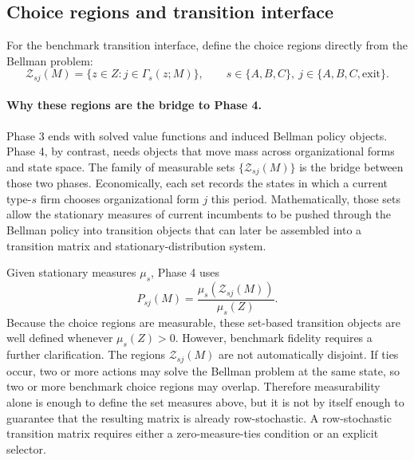 \subsection{Choice regions and transition interface}

For the benchmark transition interface, define the choice regions directly from the Bellman problem:
\[
\mathcal Z_{sj}(M)=\{z\in Z:j\in\Gamma_s(z;M)\},
\qquad s\in\{A,B,C\},\ j\in\{A,B,C,\mathrm{exit}\}.
\]
\paragraph{Why these regions are the bridge to Phase 4.}
Phase 3 ends with solved value functions and induced Bellman policy objects. Phase 4, by contrast, needs objects that move mass across organizational forms and state space. The family of measurable sets $\{\mathcal Z_{sj}(M)\}$ is the bridge between those two phases. Economically, each set records the states in which a current type-$s$ firm chooses organizational form $j$ this period. Mathematically, those sets allow the stationary measures of current incumbents to be pushed through the Bellman policy into transition objects that can later be assembled into a transition matrix and stationary-distribution system.

Given stationary measures $\mu_s$, Phase 4 uses
\[
P_{sj}(M)=\frac{\mu_s(\mathcal Z_{sj}(M))}{\mu_s(Z)}.
\]
Because the choice regions are measurable, these set-based transition objects are well defined whenever $\mu_s(Z)>0$. However, benchmark fidelity requires a further clarification. The regions $\mathcal Z_{sj}(M)$ are not automatically disjoint. If ties occur, two or more actions may solve the Bellman problem at the same state, so two or more benchmark choice regions may overlap. Therefore measurability alone is enough to define the set measures above, but it is not by itself enough to guarantee that the resulting matrix is already row-stochastic. A row-stochastic transition matrix requires either a zero-measure-ties condition or an explicit selector.

